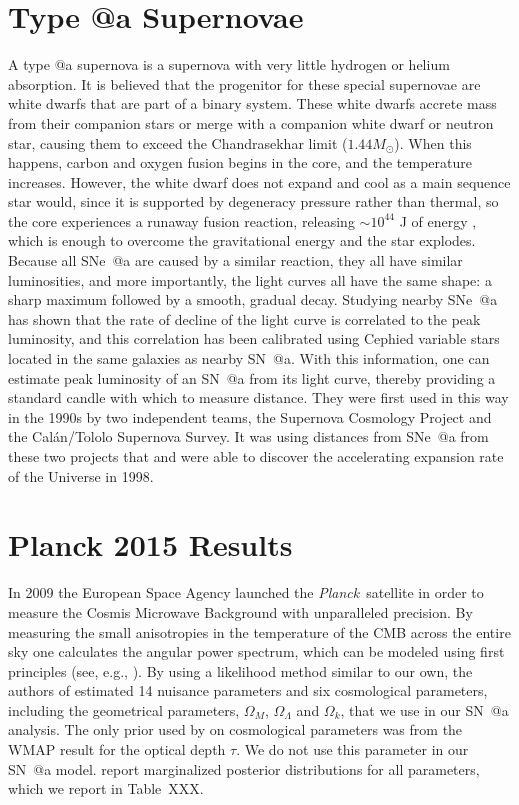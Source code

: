 \documentclass[12pt,a4paper]{article}
\makeatletter
\newcommand\Planck{{\it Planck}\ }
\newcommand*{\rom}[1]{\expandafter\@slowromancap\romannumeral #1@}
\newcommand{\sna}{\mbox{SN \rom{1}a}}
\newcommand{\snea}{\mbox{SNe \rom{1}a}}
\makeatother
\begin{document}
\section{Type \rom{1}a Supernovae}
\label{sec:SNIa}
A type \rom{1}a supernova is a supernova with very little hydrogen or
helium absorption. It is believed that the progenitor for these special
supernovae are white dwarfs that are part of a binary system. These white
dwarfs accrete mass from their companion stars or merge with a companion white
dwarf or neutron star, causing them to exceed the Chandrasekhar limit
($1.44 M_\odot$). When this happens, carbon and oxygen fusion begins in the
core, and the temperature increases. However, the white dwarf does not expand
and cool as a main sequence star would, since it is supported by degeneracy
pressure rather than thermal, so the core experiences a runaway fusion
reaction, releasing $\sim 10^{44}$ J of energy \citep[see, e.g.,][chap. 18.4]{ryden2010}, 
which is enough to overcome the gravitational energy and the star explodes. Because all 
\snea{} are caused by a similar reaction, they all have similar luminosities, and more 
importantly, the light curves all have the same shape: a sharp maximum followed by a smooth, 
gradual decay. Studying nearby \snea{} has shown that the rate of decline of the light curve 
is correlated to the peak luminosity, and this correlation has been calibrated using Cephied 
variable stars located in the same galaxies as nearby \sna{}. With this information, one can 
estimate peak luminosity of an \sna{} from its light curve, thereby providing a 
standard candle with which to measure distance. They were first used in this way in the 
1990s by two independent teams, the Supernova Cosmology Project and the Cal\'{a}n/Tololo 
Supernova Survey. It was using distances from \snea{} from these two projects that 
\citet{riess1998} and \citet{perlmutter1999} were able to discover the accelerating expansion 
rate of the Universe in 1998. 

\section{Planck 2015 Results}
\label{sec:planck}
In 2009 the European Space Agency launched the \Planck satellite in order
to measure the Cosmis Microwave Background with unparalleled precision.
By measuring the small anisotropies in the temperature of the CMB across
the entire sky one calculates the angular power spectrum, which can be
modeled using first principles (see, e.g., \citet{dodelson2003}).
By using a likelihood method similar to our own, the authors of
\citet{planck2013} estimated 14 nuisance parameters and 
six cosmological parameters, including the geometrical parameters,
$\Omega_M$, $\Omega_\Lambda$ and $\Omega_k$, that we use in our
{\sna} analysis. The only prior used by \citet{planck2013}
on cosmological parameters was from the WMAP result \citep{wmap2011}
for the optical depth $\tau$. We do not use this parameter
in our {\sna} model.\citet{planck2013} report marginalized
posterior distributions for all parameters,
which we report in Table~XXX.
\end{document}

